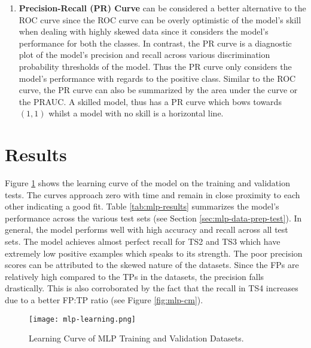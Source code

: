 \begin{enumerate}
\item \textbf{Precision-Recall (PR) Curve} can be considered a better
  alternative to the ROC curve since the ROC curve can be overly
  optimistic of the model's skill when dealing with highly skewed data
  since it considers the model's performance for both the classes. In
  contrast, the PR curve is a diagnostic plot of the model's precision
  and recall across various discrimination probability thresholds of
  the model. Thus the PR curve only considers the model's performance
  with regards to the positive class. Similar to the ROC curve, the PR
  curve can also be summarized by the area under the curve or the
  PRAUC. A skilled model, thus has a PR curve which bows towards
  $(1,1)$ whilst a model with no skill is a horizontal line.
\end{enumerate}

\section{Results}
\label{sec:mlp-disc}


Figure \ref{fig:mlp-learning} shows the learning curve of the model on
the training and validation tests. The curves approach zero with time
and remain in close proximity to each other indicating a good fit.
Table \ref{tab:mlp-results} summarizes the model's performance across
the various test sets (see Section \ref{sec:mlp-data-prep-test}). In
general, the model performs well with high accuracy and recall across
all test sets. The model achieves almost perfect recall for TS2 and
TS3 which have extremely low positive examples which speaks to its
strength. The poor precision scores can be attributed to the skewed
nature of the datasets. Since the FPs are relatively high compared to
the TPs in the datasets, the precision falls drastically. This is also
corroborated by the fact that the recall in TS4 increases due to a
better FP:TP ratio (see Figure \ref{fig:mlp-cm}).

\begin{figure}[htb]
  \centering
  \texttt{[image: mlp-learning.png]}
  \caption{Learning Curve of MLP Training and Validation Datasets.}
  \label{fig:mlp-learning}
\end{figure}

